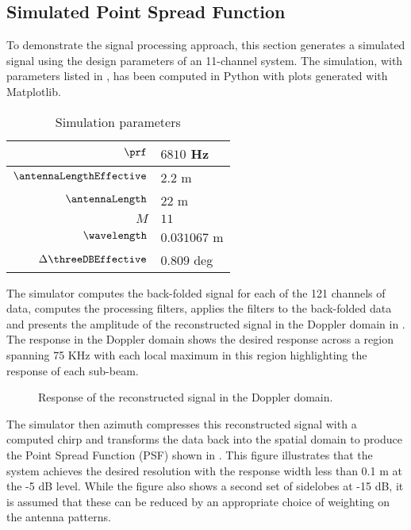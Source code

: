 \subsection{Simulated Point Spread Function}
To demonstrate the signal processing approach, this section generates a simulated signal using the design parameters of an 11-channel system. The simulation, with parameters listed in , has been computed in Python with plots generated with Matplotlib.
\begin{table}[h!]
\begin{center}
 \caption{Simulation parameters}
 \label{tb:simulation}
 \begin{tabular}{r|l}
  $\prf$ & $6810$ Hz\\\hline
  $\antennaLengthEffective$ & $2.2$ m\\\hline
  $\antennaLength$ & $22$ m\\\hline
  $M$ & $11$\\\hline
  $\wavelength$ & $0.031067$ m\\\hline
  $\Delta\threeDBEffective$ & $0.809$ deg
 \end{tabular}
 \end{center}
\end{table}
The simulator computes the back-folded signal for each of the 121 channels of data, computes the processing filters, applies the filters to the back-folded data and presents the amplitude of the reconstructed signal in the Doppler domain in . The response in the Doppler domain shows the desired response across a region spanning 75 KHz with each local maximum in this region highlighting the response of each sub-beam.
\begin{figure}[h!]
\begin{center}
 \resizebox{\columnwidth}{!}{}
 \caption{Response of the reconstructed signal in the Doppler domain.}
 \label{fg:reconstructed}
 \end{center}
\end{figure}
The simulator then azimuth compresses this reconstructed signal with a computed chirp and transforms the data back into the spatial domain to produce the Point Spread Function (PSF) shown in . This figure illustrates that the system achieves the desired resolution with the response width less than 0.1 m at the -5 dB level. While the figure also shows a second set of sidelobes at -15 dB, it is assumed that these can be reduced by an appropriate choice of weighting on the antenna patterns. 
